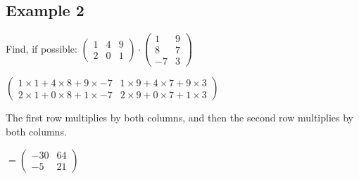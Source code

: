 \documentclass[options]{article}
\begin{document}
\subsection{Example 2}
Find, if possible: \( \begin{pmatrix} 1 & 4 & 9\\2 & 0 & 1 \end{pmatrix} \cdot \begin{pmatrix} 1 & 9\\8 & 7\\-7 & 3 \end{pmatrix} \)

\begin{center}
    \(
        \begin{pmatrix}
            1 \times 1 + 4 \times 8 + 9 \times -7 & 1 \times 9 + 4 \times 7 + 9 \times 3 \\
            2 \times 1 + 0 \times 8 + 1 \times -7 & 2 \times 9 + 0 \times 7 + 1 \times 3
        \end{pmatrix}
    \)
\end{center}
The first row multiplies by both columns, and then the second row multiplies by both columns.
\begin{center}
    \(
        =
        \begin{pmatrix}
            -30 & 64 \\
            -5 & 21
        \end{pmatrix}
    \)
\end{center}
\end{document}
